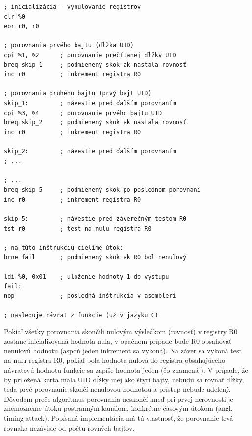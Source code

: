 \begin{lstlisting}[float,language=AVR,caption={Ukážky kódu v asembleri z funkcie \uv{checkAccess} z príkladu 2. \%0 označuje výstupný parameter. Ostatné parametre (označené \%) sú argumentami jednotlivých inštrukcií CPI. CPI porovná vždy register -- prečítaný bajt UID a konštantu -- bajt UID \uv{správnej kary} (staticky deklarovaný).},label=alg:asmCTF2]
; inicializácia - vynulovanie registrov
clr %0
eor r0, r0

; porovnania prvého bajtu (dĺžka UID)
cpi %1, %2      ; porovnanie prečítanej dĺžky UID
breq skip_1     ; podmienený skok ak nastala rovnosť
inc r0          ; inkrement registra R0

; porovnania druhého bajtu (prvý bajt UID)
skip_1:         ; návestie pred ďalším porovnaním
cpi %3, %4      ; porovnanie prvého bajtu UID
breq skip_2     ; podmienený skok ak nastala rovnosť
inc r0          ; inkrement registra R0

skip_2:         ; návestie pred ďalším porovnaním
; ...

; ...
breq skip_5     ; podmienený skok po poslednom porovnaní
inc r0          ; inkrement registra R0

skip_5:         ; návestie pred záverečným testom R0
tst r0          ; test na nulu registra R0

; na túto inštrukciu cielime útok:
brne fail       ; podmienený skok ak R0 bol nenulový

ldi %0, 0x01    ; uloženie hodnoty 1 do výstupu
fail:
nop             ; posledná inštrukcia v asembleri

; nasleduje návrat z funkcie (už v jazyku C)
\end{lstlisting}

Pokiaľ všetky porovnania skončili nulovým výsledkom (rovnosť) v registry R0 zostane inicializovaná hodnota nula, v opačnom prípade bude R0 obsahovať nenulovú hodnotu (aspoň jeden inkrement sa vykoná). Na záver sa vykoná test na nulu registra R0, pokiaľ bola hodnota nulová do registra obsahujúceho návratovú hodnotu funkcie sa zapíše hodnota jeden (čo znamená ). V prípade, že by priložená karta mala UID dĺžky inej ako štyri bajty, nebudú sa rovnať dĺžky, teda prvé porovnanie skončí nenulovou hodnotou a prístup nebude udelený. Dôvodom prečo algoritmus porovnania neskončí hneď pri prvej nerovnosti je znemožnenie útoku postranným kanálom, konkrétne časovým útokom (angl. timing attack). Popísaná implementácia má tú vlastnosť, že porovnanie trvá rovnako nezávisle od počtu rovných bajtov.

